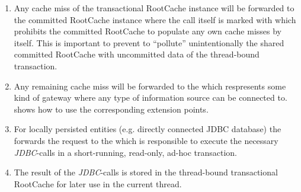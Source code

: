 \begin{itemize}
\begin{enumerate}
			\item Any cache miss of the transactional RootCache instance will be forwarded to the committed RootCache instance where the call itself is marked with  which prohibits the committed RootCache to populate any own cache misses by itself. This is important to prevent to ``pollute'' unintentionally the shared committed RootCache with uncommitted data of the thread-bound transaction.
			\item Any remaining cache miss will be forwarded to the  which respresents some kind of gateway where any type of information source can be connected to.  shows how to use the corresponding extension points.
			\item For locally persisted entities (e.g. directly connected JDBC database) the  forwards the request to the  which is responsible to execute the necessary \emph{JDBC}-calls in a short-running, read-only, ad-hoc transaction.
			\item The result of the \emph{JDBC}-calls is stored in the thread-bound transactional RootCache for later use in the current thread.
		\end{enumerate}
\end{itemize}
